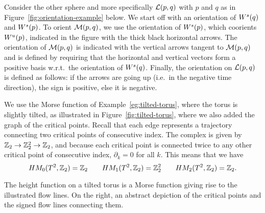     \begin{eg}
        Consider the other sphere and more specifically $\L pq$ with $p$ and  $q$ as in Figure~\ref{fig:orientation-example} below. 
        We start off with an orientation of $\stable q$ and  $\stable p$.
        To orient  $\traj pq$, we use the orientation of  $\stable p$, which coorients $\unstable p$, indicated in the figure with the thick black horizontal arrows.
        The orientation of $\traj pq$ is indicated with the vertical arrows tangent to  $\traj pq$ and is defined by requiring that the horizontal and vertical vectors form a positive basis w.r.t.\ the orientation of  $\stable q$.
        Finally, the orientation on $\L pq$ is defined as follows: if the arrows are going up (i.e.\ in the negative time direction), the sign is positive, else it is negative.
        \begin{figure}[H]
    \centering
\end{figure}
    \end{eg}
    \filbreak
\begin{eg}
    We use the Morse function of Example~\ref{eg:tilted-torus}, where the torus is slightly tilted, as illustrated in Figure~\ref{fig:tilted-torus}, where we also added the graph of the critical points.
    Recall that each edge represents a trajectory connecting two critical points of consecutive index.
    The complex is given by $ \Z_2 \to  \Z_2^2 \to \Z_2$, and because each critical point is connected twice to any other critical point of consecutive index, $\partial_k = 0$ for all $k$. 
    This means that we have
    \[
        \HMf[0]{T^2, \Z_2} = \Z_2 \qquad
        \HMf[1]{T^2, \Z_2} = \Z_2^2 \qquad
        \HMf[2]{T^2, \Z_2} = \Z_2
    .\] 
\end{eg}
\begin{marginfigure}
    \centering
    \caption{The height function on a tilted torus is a Morse function giving rise to the illustrated flow lines.
        On the right, an abstract depiction of the critical points and the signed flow lines connecting them.
    }

    \label{fig:tilted-torus}
\end{marginfigure}
